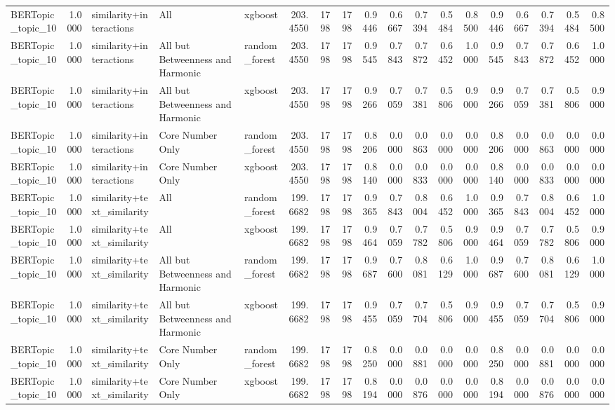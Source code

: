 \begin{tabular}{lrlllrrrrrrrrrrrrr}
BERTopic_topic_10 & 1.0000 & similarity+interactions & All & xgboost & 203.4550 & 1798 & 1798 & 0.9446 & 0.6667 & 0.7394 & 0.5484 & 0.8500 & 0.9446 & 0.6667 & 0.7394 & 0.5484 & 0.8500 \\
BERTopic_topic_10 & 1.0000 & similarity+interactions & All but Betweenness and Harmonic & random_forest & 203.4550 & 1798 & 1798 & 0.9545 & 0.7843 & 0.7872 & 0.6452 & 1.0000 & 0.9545 & 0.7843 & 0.7872 & 0.6452 & 1.0000 \\
BERTopic_topic_10 & 1.0000 & similarity+interactions & All but Betweenness and Harmonic & xgboost & 203.4550 & 1798 & 1798 & 0.9266 & 0.7059 & 0.7381 & 0.5806 & 0.9000 & 0.9266 & 0.7059 & 0.7381 & 0.5806 & 0.9000 \\
BERTopic_topic_10 & 1.0000 & similarity+interactions & Core Number Only & random_forest & 203.4550 & 1798 & 1798 & 0.8206 & 0.0000 & 0.0863 & 0.0000 & 0.0000 & 0.8206 & 0.0000 & 0.0863 & 0.0000 & 0.0000 \\
BERTopic_topic_10 & 1.0000 & similarity+interactions & Core Number Only & xgboost & 203.4550 & 1798 & 1798 & 0.8140 & 0.0000 & 0.0833 & 0.0000 & 0.0000 & 0.8140 & 0.0000 & 0.0833 & 0.0000 & 0.0000 \\
BERTopic_topic_10 & 1.0000 & similarity+text_similarity & All & random_forest & 199.6682 & 1798 & 1798 & 0.9365 & 0.7843 & 0.8004 & 0.6452 & 1.0000 & 0.9365 & 0.7843 & 0.8004 & 0.6452 & 1.0000 \\
BERTopic_topic_10 & 1.0000 & similarity+text_similarity & All & xgboost & 199.6682 & 1798 & 1798 & 0.9464 & 0.7059 & 0.7782 & 0.5806 & 0.9000 & 0.9464 & 0.7059 & 0.7782 & 0.5806 & 0.9000 \\
BERTopic_topic_10 & 1.0000 & similarity+text_similarity & All but Betweenness and Harmonic & random_forest & 199.6682 & 1798 & 1798 & 0.9687 & 0.7600 & 0.8081 & 0.6129 & 1.0000 & 0.9687 & 0.7600 & 0.8081 & 0.6129 & 1.0000 \\
BERTopic_topic_10 & 1.0000 & similarity+text_similarity & All but Betweenness and Harmonic & xgboost & 199.6682 & 1798 & 1798 & 0.9455 & 0.7059 & 0.7704 & 0.5806 & 0.9000 & 0.9455 & 0.7059 & 0.7704 & 0.5806 & 0.9000 \\
BERTopic_topic_10 & 1.0000 & similarity+text_similarity & Core Number Only & random_forest & 199.6682 & 1798 & 1798 & 0.8250 & 0.0000 & 0.0881 & 0.0000 & 0.0000 & 0.8250 & 0.0000 & 0.0881 & 0.0000 & 0.0000 \\
BERTopic_topic_10 & 1.0000 & similarity+text_similarity & Core Number Only & xgboost & 199.6682 & 1798 & 1798 & 0.8194 & 0.0000 & 0.0876 & 0.0000 & 0.0000 & 0.8194 & 0.0000 & 0.0876 & 0.0000 & 0.0000 \\

\end{tabular}
